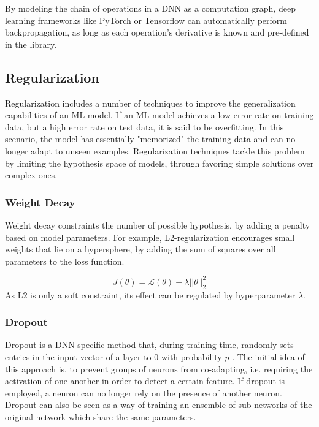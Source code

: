 By modeling the chain of operations in a DNN as a computation graph, deep learning frameworks like PyTorch \cite{NEURIPS2019_9015} or Tensorflow \cite{tensorflow2015-whitepaper} can automatically perform backpropagation, as long as each operation's derivative is known and pre-defined in the library.

\subsection{Regularization}
Regularization includes a number of techniques to improve the generalization capabilities of an ML model. If an ML model achieves a low error rate on training data, but a high error rate on test data, it is said to be overfitting. In this scenario, the model has essentially "memorized" the training data and can no longer adapt to unseen examples. Regularization techniques tackle this problem by limiting the hypothesis space of models, through favoring simple solutions over complex ones.

\subsubsection{Weight Decay}
Weight decay constraints the number of possible hypothesis, by adding a penalty based on model parameters. For example, L2-regularization encourages small weights that lie on a hypersphere, by adding the sum of squares over all parameters to the loss function.

\begin{equation}
    J(\theta) = \mathcal{L}(\theta) + \lambda ||\theta||_2^2
\end{equation}
As L2 is only a soft constraint, its effect can be regulated by hyperparameter $\lambda$.

\subsubsection{Dropout}
Dropout is a DNN specific method that, during training time, randomly sets entries in the input vector of a layer to $0$ with probability $p$ \cite{DBLP:journals/corr/abs-1207-0580}. The initial idea of this approach is, to prevent groups of neurons from co-adapting, i.e. requiring the activation of one another in order to detect a certain feature. If dropout is employed, a neuron can no longer rely on the presence of another neuron. Dropout can also be seen as a way of training an ensemble of sub-networks of the original network which share the same parameters.


